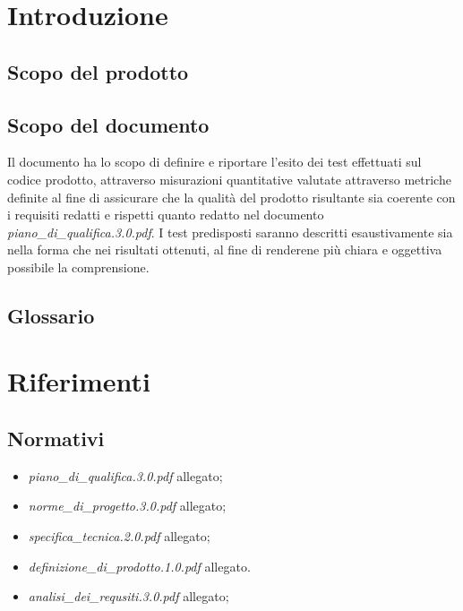 \setcounter{page}{1}
\pagestyle{normal}

\newpage

\section{Introduzione}
\subsection{Scopo del prodotto}
\purpose

\subsection{Scopo del documento}
Il documento ha lo scopo di definire e riportare l'esito dei test effettuati sul codice prodotto, attraverso misurazioni quantitative valutate attraverso metriche definite al fine di assicurare che la qualità del prodotto risultante sia coerente con i requisiti redatti e rispetti quanto redatto nel documento \textit{piano\_di\_qualifica.3.0.pdf}.
I test predisposti saranno descritti esaustivamente sia nella forma che nei risultati ottenuti, al fine di renderene più chiara e oggettiva possibile la comprensione.

\subsection{Glossario}
\glossaryIntro
\clearpage

\section{Riferimenti}
\subsection{Normativi}
\begin{itemize}
\item[] \textit{piano\_di\_qualifica.3.0.pdf} allegato;
\item[] \textit{norme\_di\_progetto.3.0.pdf} allegato;
\item[] \textit{specifica\_tecnica.2.0.pdf} allegato;
\item[] \textit{definizione\_di\_prodotto.1.0.pdf} allegato.
\item[] \textit{analisi\_dei\_requsiti.3.0.pdf} allegato;
\end{itemize}

